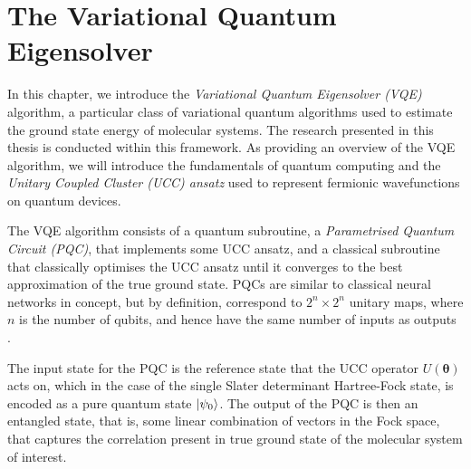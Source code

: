 \section{The Variational Quantum Eigensolver}%
\label{vqe}






In this chapter, we introduce the \textit{Variational Quantum Eigensolver (VQE)} algorithm, a particular class of variational quantum algorithms used to estimate the ground state energy of molecular systems. The research presented in this thesis is conducted within this framework. As providing an overview of the VQE algorithm, we will introduce the fundamentals of quantum computing and the \textit{Unitary Coupled Cluster (UCC) ansatz} used to represent fermionic wavefunctions on quantum devices.

The VQE algorithm consists of a quantum subroutine, a \textit{Parametrised Quantum Circuit (PQC)}, that implements some UCC ansatz, and a classical subroutine that classically optimises the UCC ansatz until it converges to the best approximation of the true ground state. PQCs are similar to classical neural networks in concept, but by definition, correspond to $2^n \times 2^n$ unitary maps, where $n$ is the number of qubits, and hence have the same number of inputs as outputs \cite{Yeung2020}.

The input state for the PQC is the reference state that the UCC operator $U(\bm\theta)$ acts on, which in the case of the single Slater determinant Hartree-Fock state, is encoded as a pure quantum state $\ket{\psi_0}$. The output of the PQC is then an entangled state, that is, some linear combination of vectors in the Fock space, that captures the correlation present in true ground state of the molecular system of interest.

